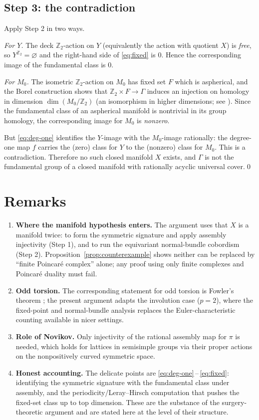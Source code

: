 \documentclass[11pt]{article}
\newcommand{\Z}{\mathbb{Z}}
\begin{document}
\subsection*{Step 3: the contradiction}

Apply Step 2 in two ways.

\emph{For $Y$.} The deck $\Z_2$-action on $Y$ (equivalently the action with
quotient $X$) is \emph{free}, so $Y^{\Z_2}=\varnothing$ and the right-hand side
of \eqref{eq:fixed} is $0$. Hence the corresponding image of the fundamental
class is $0$.

\emph{For $M_0$.} The isometric $\Z_2$-action on $M_0$ has fixed set $F$ which is
aspherical, and the Borel construction shows that
$\Z_2\times F\to\Gamma$ induces an injection on homology in dimension
$\dim(M_0/\Z_2)$ (an isomorphism in higher dimensions; see \cite{Borel}). Since
the fundamental class of an aspherical manifold is nontrivial in its group
homology, the corresponding image for $M_0$ is \emph{nonzero}.

But \eqref{eq:deg-one} identifies the $Y$-image with the $M_0$-image rationally:
the degree-one map $f$ carries the (zero) class for $Y$ to the (nonzero) class
for $M_0$. This is a contradiction. Therefore no such closed manifold $X$
exists, and $\Gamma$ is not the fundamental group of a closed manifold with
rationally acyclic universal cover.\qed

\section*{Remarks}

\begin{enumerate}\setlength\itemsep{4pt}
\item \textbf{Where the manifold hypothesis enters.} The argument uses that $X$
is a manifold twice: to form the symmetric signature and apply assembly
injectivity (Step 1), and to run the equivariant normal-bundle cobordism (Step
2). Proposition~\ref{prop:counterexample} shows neither can be replaced by
``finite Poincar\'e complex'' alone; any proof using only finite complexes and
Poincar\'e duality must fail.
\item \textbf{Odd torsion.} The corresponding statement for odd torsion is
Fowler's theorem \cite{W2}; the present argument adapts the involution case
($p=2$), where the fixed-point and normal-bundle analysis replaces the
Euler-characteristic counting available in nicer settings.
\item \textbf{Role of Novikov.} Only injectivity of the rational assembly map
for $\pi$ is needed, which holds for lattices in semisimple groups via their
proper actions on the nonpositively curved symmetric space.
\item \textbf{Honest accounting.} The delicate points are
\eqref{eq:deg-one}\,--\,\eqref{eq:fixed}: identifying the symmetric signature with
the fundamental class under assembly, and the periodicity/Leray--Hirsch
computation that pushes the fixed-set class up to top dimension. These are the
substance of the surgery-theoretic argument and are stated here at the level of
their structure.
\end{enumerate}
\end{document}
